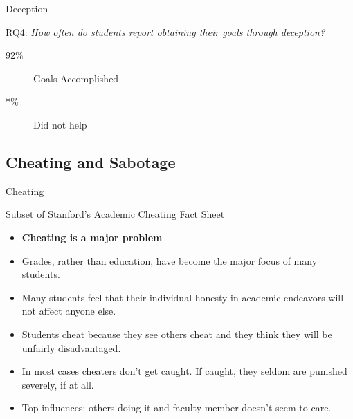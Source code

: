 		\begin{frame}{Deception}
				
			RQ4: \emph{How often do students report obtaining their goals through deception?}

			\begin{description}
				\item[92\%]
					Goals Accomplished
				\item[*\%]
					Did not help
			\end{description}

		\end{frame}

	\subsection{Cheating and Sabotage}

		\begin{frame}{Cheating}
				
			Subset of Stanford's Academic Cheating Fact Sheet

			\begin{itemize}
				\item 
					\textbf{Cheating is a major problem}
				\item 
					Grades, rather than education, have become the major focus of many students.
				\item 
					Many students feel that their individual honesty in academic endeavors will not affect anyone else.
				\item 
					Students cheat because they see others cheat and they think they will be unfairly disadvantaged.
				\item 
					In most cases cheaters don't get caught. If caught, they seldom are punished severely, if at all.
				\item
					Top influences: others doing it and faculty member doesn't seem to care.
			\end{itemize}

		\end{frame}

